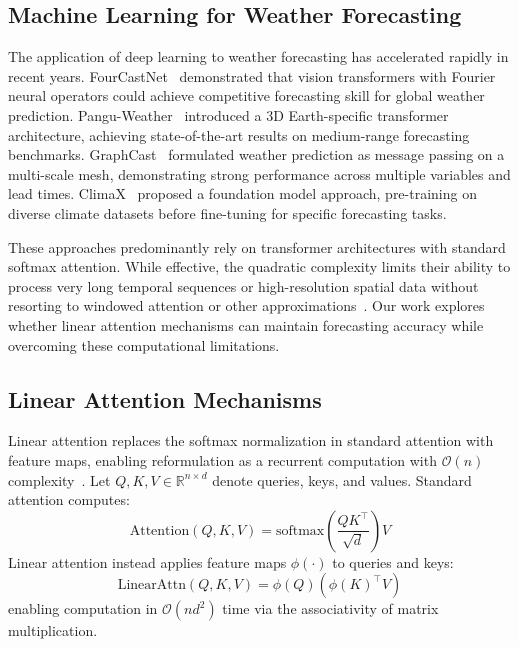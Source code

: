 \documentclass[runningheads]{llncs}
\begin{document}
\subsection{Machine Learning for Weather Forecasting}

The application of deep learning to weather forecasting has accelerated rapidly in recent years. FourCastNet~\cite{pathak2022fourcastnet} demonstrated that vision transformers with Fourier neural operators could achieve competitive forecasting skill for global weather prediction. Pangu-Weather~\cite{bi2023accurate} introduced a 3D Earth-specific transformer architecture, achieving state-of-the-art results on medium-range forecasting benchmarks. GraphCast~\cite{lam2023learning} formulated weather prediction as message passing on a multi-scale mesh, demonstrating strong performance across multiple variables and lead times. ClimaX~\cite{nguyen2023climax} proposed a foundation model approach, pre-training on diverse climate datasets before fine-tuning for specific forecasting tasks.

These approaches predominantly rely on transformer architectures with standard softmax attention. While effective, the quadratic complexity limits their ability to process very long temporal sequences or high-resolution spatial data without resorting to windowed attention or other approximations~\cite{liu2021swin}. Our work explores whether linear attention mechanisms can maintain forecasting accuracy while overcoming these computational limitations.

\subsection{Linear Attention Mechanisms}

Linear attention replaces the softmax normalization in standard attention with feature maps, enabling reformulation as a recurrent computation with $\mathcal{O}(n)$ complexity~\cite{katharopoulos2020transformers}. Let $Q, K, V \in \mathbb{R}^{n \times d}$ denote queries, keys, and values. Standard attention computes:
\begin{equation}
    \text{Attention}(Q, K, V) = \text{softmax}\left(\frac{QK^\top}{\sqrt{d}}\right) V
\end{equation}
Linear attention instead applies feature maps $\phi(\cdot)$ to queries and keys:
\begin{equation}
    \text{LinearAttn}(Q, K, V) = \phi(Q)\left(\phi(K)^\top V\right)
\end{equation}
enabling computation in $\mathcal{O}(nd^2)$ time via the associativity of matrix multiplication.
\end{document}
